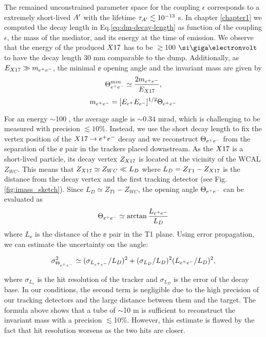The remained unconstrained parameter space for the coupling $\epsilon$  corresponds to a extremely short-lived $A'$ with the lifetime $\tau_{A'} \lesssim 10^{-13}$ s. In chapter \ref{chapter1} we computed the decay length in Eq.\ref{eq:dm-decay-length} as function of the coupling $\epsilon$, the mass of the mediator, and its energy at the time of emission.
We observe that the energy of the produced $X17$ has to be $\gtrsim$100 $\gev$ to have the decay length 30 mm comparable to the dump.
Additionally, as $E_{X17} \gg m_{e^+e^-}$, the minimal $\ee$ opening angle and the invariant mass are given by
\begin{equation} 
\Theta_{ e^+e^-}^{min} \simeq  \frac{2m_{e^+e^-}}{E_{X17}},
\label{eqn:angle}
\end{equation}
\begin{equation}
m_{e^+e^-} = [E_{e^+} E_{e^-}]^{1/2} \Theta_{ e^+e^-}
\label{eqn:imass}
\end{equation}

For an energy $\sim$100 \gev, the average angle is $\sim$0.34 mrad, which is challenging to be measured with precision $\lesssim 10\%$. Instead, we use the short decay length to fix the vertex position of the $X17 \rightarrow e^+ e^-$ decay and we reconstruct $\Theta_{ e^+e^-}$ from the separation of the $\ee$ pair in the trackers placed downstream. As the $X17$ is a short-lived particle, its decay vertex $Z_{X17}$ is located at the vicinity of the WCAL $Z_{WC}$. This means that $Z_{X17} \simeq Z_{WC} \ll L_D$ where $L_D=Z_{T1}-Z_{X17}$ is the distance from the decay vertex and the first tracking detector (see Fig.\ref{fig:imass_sketch}). Since $L_D \simeq Z_{T1} - Z_{WC}$, the opening angle $\Theta_{ e^+e^-}$ can be evaluated as 
\begin{equation}
\Theta_{ e^+e^-} \simeq \arctan{\frac{ L_{e^+e^-}}{L_D}}
\label{angle-est}
\end{equation}
where $L_{\ee}$ is the distance of the $\ee$ pair in the T1 plane. Using error propagation, we can estimate the uncertainty on the angle:

\begin{equation}
  \sigma^2_{\Theta_{ e^+e^-}} \simeq (\sigma_{L_{e^+e^-}}  / L_D)^2 + (\sigma_{L_D} / L_D)^2(L_{e^+e^-} / L_D)^2,
  \label{eqn:thetaerr}
\end{equation}

where $\sigma_{L_{\ee}}$ is the hit resolution of the tracker and $\sigma_{L_D}$ is the error of the decay base. In our conditions, the second term is negligible due to the high precision of our tracking detectors and the large distance between them and the target. The formula above shows that a tube of $\sim$10 m is sufficient to reconstruct the invariant mass with a precision $\lesssim$10\%. However, this estimate is flawed by the fact that hit resolution worsens as the two hits are closer.

